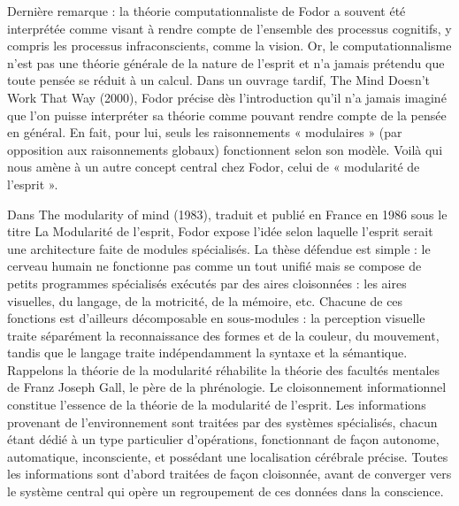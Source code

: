 
Dernière remarque : la théorie computationnaliste de Fodor a souvent été interprétée comme visant à rendre compte de l’ensemble des processus cognitifs, y compris les processus infraconscients, comme la vision. Or, le computationnalisme n’est pas une théorie générale de la nature de l’esprit et n’a jamais prétendu que toute pensée se réduit à un calcul. Dans un ouvrage tardif, The Mind Doesn't Work That Way (2000), Fodor précise dès l'introduction qu’il n’a jamais imaginé que l’on puisse interpréter sa théorie comme pouvant rendre compte de la pensée en général. En fait, pour lui, seuls les raisonnements « modulaires » (par opposition aux raisonnements globaux) fonctionnent selon son modèle. Voilà qui nous amène à un autre concept central chez Fodor, celui de « modularité de l’esprit ».\par

\par

Dans The modularity of mind (1983), traduit et publié en France en 1986 sous le titre La Modularité de l'esprit, Fodor expose l’idée selon laquelle l’esprit serait une architecture faite de modules spécialisés. La thèse défendue est simple : le cerveau humain ne fonctionne pas comme un tout unifié mais se compose de petits programmes spécialisés exécutés par des aires cloisonnées : les aires visuelles, du langage, de la motricité, de la mémoire, etc. Chacune de ces fonctions est d’ailleurs décomposable en sous-modules : la perception visuelle traite séparément la reconnaissance des formes et de la couleur, du mouvement, tandis que le langage traite indépendamment la syntaxe et la sémantique. Rappelons la théorie de la modularité réhabilite la théorie des facultés mentales de Franz Joseph Gall, le père de la phrénologie. Le cloisonnement informationnel constitue l’essence de la théorie de la modularité de l’esprit. Les informations provenant de l’environnement sont traitées par des systèmes spécialisés, chacun étant dédié à un type particulier d’opérations, fonctionnant de façon autonome, automatique, inconsciente, et possédant une localisation cérébrale précise. Toutes les informations sont d’abord traitées de façon cloisonnée, avant de converger vers le système central qui opère un regroupement de ces données dans la conscience.\par


